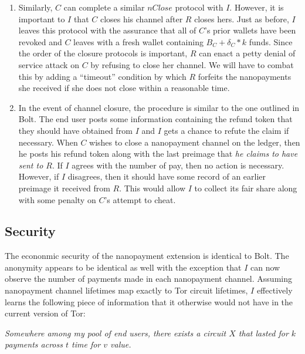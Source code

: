 \documentclass{article}
\begin{document}
\begin{enumerate}
\item Similarly, $C$ can complete a similar $nClose$ protocol with $I$. However, it is important to $I$ that $C$ closes his channel after $R$ closes hers. Just as before, $I$ leaves this protocol with the assurance that all of $C$'s prior wallets have been revoked and $C$ leaves with a fresh wallet containing $B_C + \delta_C * k$ funds. Since the order of the closure protocols is important, $R$ can enact a petty denial of service attack on $C$ by refusing to close her channel. We will have to combat this by adding a ``timeout'' condition by which $R$ forfeits the nanopayments she received if she does not close within a reasonable time.

\item In the event of channel closure, the procedure is similar to the one outlined in Bolt. The end user posts some information containing the refund token that they should have obtained from $I$ and $I$ gets a chance to refute the claim if necessary. When $C$ wishes to close a nanopayment channel on the ledger, then he posts his refund token along with the last preimage that \emph{he claims to have sent to $R$}. If $I$ agrees with the number of pay, then no action is necessary. However, if $I$ disagrees, then it should have some record of an earlier preimage it received from $R$. This would allow $I$ to collect its fair share along with some penalty on $C$'s attempt to cheat.
\end{enumerate}

\subsection{Security}
The econonmic security of the nanopayment extension is identical to Bolt. The anonymity appears to be identical as well with the exception that $I$ can now observe the number of payments made in each nanopayment channel. Assuming nanopayment channel lifetimes map exactly to Tor circuit lifetimes, $I$ effectively learns the following piece of information that it otherwise would not have in the current version of Tor:

\emph{Somewhere among my pool of end users, there exists a circuit $X$ that lasted for $k$ payments across $t$ time for $v$ value.}
\end{document}
